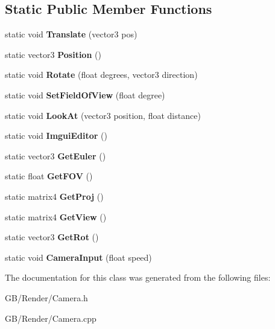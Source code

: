 \subsection*{Static Public Member Functions}
\begin{DoxyCompactItemize}
\item 
\mbox{\label{class_g_b_1_1_camera_ac943ec597ca5597a7dce24c459a3a2e4}} 
static void {\bfseries Translate} (vector3 pos)
\item 
\mbox{\label{class_g_b_1_1_camera_a52e22ce2a2af5342be4d4c9450fddc0a}} 
static vector3 {\bfseries Position} ()
\item 
\mbox{\label{class_g_b_1_1_camera_a258ef79d68f86f30c4e2d7577dedcbbf}} 
static void {\bfseries Rotate} (float degrees, vector3 direction)
\item 
\mbox{\label{class_g_b_1_1_camera_ac7ffebd51cc8b2de1e6ca655cf616dfb}} 
static void {\bfseries Set\+Field\+Of\+View} (float degree)
\item 
\mbox{\label{class_g_b_1_1_camera_a6a0f2d8739605a2fe80ace6b66888674}} 
static void {\bfseries Look\+At} (vector3 position, float distance)
\item 
\mbox{\label{class_g_b_1_1_camera_a46e36c9279becb76a4c03cd7e4185a1d}} 
static void {\bfseries Imgui\+Editor} ()
\item 
\mbox{\label{class_g_b_1_1_camera_aafdc983127e5542470a59345c89efc56}} 
static vector3 {\bfseries Get\+Euler} ()
\item 
\mbox{\label{class_g_b_1_1_camera_a48de9a58fcfd7448602febd592d25165}} 
static float {\bfseries Get\+F\+OV} ()
\item 
\mbox{\label{class_g_b_1_1_camera_a09b726e7e88778a95fd3d8debaa5c07f}} 
static matrix4 {\bfseries Get\+Proj} ()
\item 
\mbox{\label{class_g_b_1_1_camera_a6ce0107f8d5dc9326cc552d3f8594afc}} 
static matrix4 {\bfseries Get\+View} ()
\item 
\mbox{\label{class_g_b_1_1_camera_acc25e7367391f730a371be9b1b60f679}} 
static vector3 {\bfseries Get\+Rot} ()
\item 
\mbox{\label{class_g_b_1_1_camera_a7abbe5cfbb00af253fc75d7770ed1583}} 
static void {\bfseries Camera\+Input} (float speed)
\end{DoxyCompactItemize}


The documentation for this class was generated from the following files\+:\begin{DoxyCompactItemize}
\item 
G\+B/\+Render/Camera.\+h\item 
G\+B/\+Render/Camera.\+cpp\end{DoxyCompactItemize}

